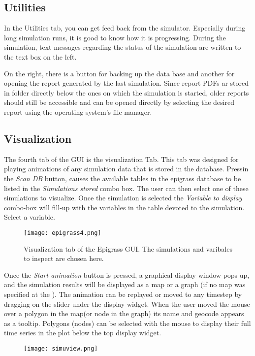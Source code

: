 \documentclass[a4paper,10pt,english]{sphinxmanual}
\begin{document}
\subsection{Utilities}
\label{using:utilities}
In the Utilities tab, you can get feed back from the simulator. Especially during long simulation runs, it is good to know how it is progressing. During the simulation, text messages regarding the status of the simulation are written to the text box on the left.

On the right, there is a button for backing up the data base and another for opening the report generated by the last simulation. Since report PDFs ar stored in folder directly below the ones on which the simulation is started, older reports should still be accessible and can be opened directly by selecting the desired report using the operating system's file manager.


\subsection{Visualization}
\label{using:visualization}
The fourth tab of the GUI is the visualization Tab. This tab was designed for playing animations of any simulation data that is stored in the database. Pressin the \emph{Scan DB} button, causes the available tables in the  epigrass database to be listed in the \emph{Simulations stored} combo box. The user can then select one of these simulations to visualize. Once the simulation is selected the \emph{Variable to display} combo-box will fill-up with the variables in the table devoted to the simulation. Select a variable.
\begin{figure}[htbp]
\centering
\capstart

\texttt{[image: epigrass4.png]}
\caption{Visualization tab of the Epigrass GUI. The simulations and varibales to inspect are chosen here.}\end{figure}

Once the \emph{Start animation} button is pressed, a graphical display window pops up, and the simulation results will be displayed as a map or a graph (if no map was specified at the ). The animation can be replayed or moved to any timestep by dragging on the slider under the display widget. When the user moved the mouse over a polygon in the map(or node in the graph) its name and geocode appears as a tooltip. Polygons (nodes) can be selected with the mouse to display their full time series in the plot below the top display widget.
\begin{figure}[htbp]
\centering

\texttt{[image: simuview.png]}
\end{figure}
\end{document}
